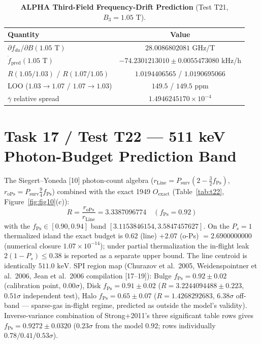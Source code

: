 \documentclass[12pt,a4paper]{article}
\begin{document}
\begin{table}[!htbp]
\centering
\footnotesize
\setlength{\tabcolsep}{3pt}
\caption{\textbf{ALPHA Third-Field Frequency-Drift Prediction} (Test T21, $B_3=1.05\text{ T}$).}
\label{tab:t21}
\vspace{0.1cm}
\begin{tabular}{@{}l|c@{}}
\hline
Quantity & Value \\
\hline
$\partial f_{da}/\partial B(1.05\text{ T})$ & $28.0086802081$ GHz/T \\
$\dot{f}_{\mathrm{pred}}(1.05\text{ T})$ & $-74.2301213010 \pm 0.0055473080$ kHz/h \\
$R(1.05/1.03)$ / $R(1.07/1.05)$ & $1.0194406565$ / $1.0190695066$ \\
LOO ($1.03\to1.07$ / $1.07\to1.03$) & $149.5$ / $149.5\text{ ppm}$ \\
$\bar{\gamma}$ relative spread & $1.4946245170\times 10^{-4}$ \\
\hline
\end{tabular}
\end{table}

\section{Task 17 / Test T22 --- 511 keV Photon-Budget Prediction Band}

The Siegert--Yoneda [10] photon-count algebra ($r_{\mathrm{Line}}=P_{\mathrm{surv}}(2-\frac32f_{\mathrm{Ps}})$, $r_{\mathrm{oPs}}=P_{\mathrm{surv}}\frac94f_{\mathrm{Ps}}$) combined with the exact 1949 $O_{\mathrm{exact}}$ (Table~\ref{tab:t22}, Figure~\ref{fig:fig10}(c)):
\begin{equation}
\boxed{R = \frac{r_{\mathrm{oPs}}}{r_{\mathrm{Line}}} = 3.3387096774 \quad (f_{\mathrm{Ps}} = 0.92)}
\label{eq:t22R}
\end{equation}
with the $f_{\mathrm{Ps}}\in[0.90,0.94]$ band $[3.1153846154, 3.5847457627]$. On the $P_s=1$ thermalized island the exact budget is $0.62$ (line) $+2.07$ (o-Ps) $=2.6900000000$ (numerical closure $1.07\times 10^{-14}$); under partial thermalization the in-flight leak $2(1-P_s)\le 0.38$ is reported as a separate upper bound. The line centroid is identically $511.0\text{ keV}$. SPI region map (Churazov et al.\ 2005, Weidenspointner et al.\ 2006, Jean et al.\ 2006 compilation [17--19]): Bulge $f_{\mathrm{Ps}}=0.92\pm0.02$ (calibration point, $0.00\sigma$), Disk $f_{\mathrm{Ps}}=0.91\pm0.02$ ($R=3.2244094488\pm0.223$, $0.51\sigma$ independent test), Halo $f_{\mathrm{Ps}}=0.65\pm0.07$ ($R=1.4268292683$, $6.38\sigma$ off-band --- sparse-gas in-flight regime, predicted as outside the model's validity). Inverse-variance combination of Strong+2011's three significant table rows gives $f_{\mathrm{Ps}}=0.9272\pm0.0320$ ($0.23\sigma$ from the model $0.92$; rows individually $0.78/0.41/0.53\sigma$).
\end{document}
